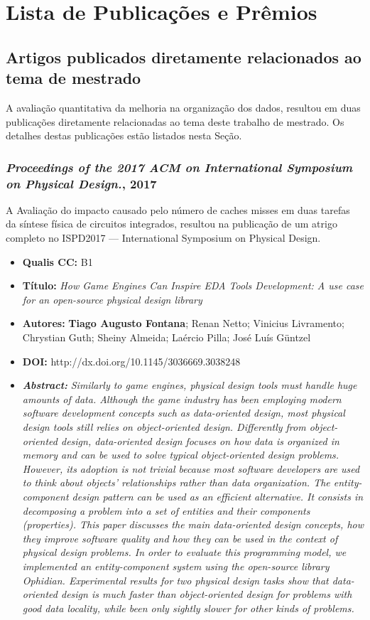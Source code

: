\chapter{Lista de Publicações e Prêmios}
\label{ap:producoes}
\section{Artigos publicados diretamente relacionados ao tema de mestrado}

A avaliação quantitativa da melhoria na organização dos dados, resultou em duas publicações diretamente relacionadas ao tema deste trabalho de mestrado. Os detalhes destas publicações estão listados nesta Seção.

\subsection{\textit{Proceedings of the 2017 ACM on International Symposium on Physical Design.}, 2017}

A Avaliação do impacto causado pelo número de caches misses em duas tarefas da síntese física de circuitos integrados, resultou na publicação de um atrigo completo no ISPD2017 --- International Symposium on Physical Design.

\begin{itemize}
\item \textbf{Qualis CC:} B1
\item \textbf{Título:} \textit{How Game Engines Can Inspire EDA Tools Development: A use case for an open-source physical design library}
\item \textbf{Autores:}  \textbf{Tiago Augusto Fontana}; Renan Netto; Vinicius Livramento; Chrystian Guth; Sheiny Almeida; Laércio Pilla; José Luís Güntzel
\item \textbf{DOI:} http://dx.doi.org/10.1145/3036669.3038248
\item \textbf{\textit{Abstract:}} \emph{Similarly to game engines, physical design tools must handle huge amounts of data. Although the game industry has been employing modern software development concepts such as data-oriented design, most physical design tools still relies on object-oriented design. Differently from object-oriented design, data-oriented design focuses on how data is organized in memory and can be used to solve typical object-oriented design problems. However, its adoption is not trivial because most software developers are used to think about objects' relationships rather than data organization. The entity-component design pattern can be used as an efficient alternative. It consists in decomposing a problem into a set of entities and their components (properties). This paper discusses the main data-oriented design concepts, how they improve software quality and how they can be used in the context of physical design problems. In order to evaluate this programming model, we implemented an entity-component system using the open-source library Ophidian. Experimental results for two physical design tasks show that data-oriented design is much faster than object-oriented design for problems with good data locality, while been only sightly slower for other kinds of problems.}
\end{itemize}


